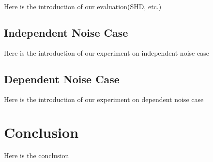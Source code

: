 \documentclass[10pt]{article}
\begin{document}
Here is the introduction of our evaluation(SHD, etc.)

\subsection{Independent Noise Case}

Here is the introduction of our experiment on independent noise case

\subsection{Dependent Noise Case}

Here is the introduction of our experiment on dependent noise case

\section{Conclusion}

Here is the conclusion



\end{document}
